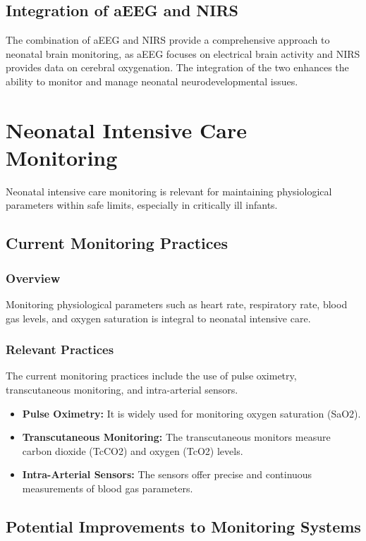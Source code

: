 \documentclass[12pt,journal,compsoc]{IEEEtran}
\begin{document}
\subsection{Integration of aEEG and NIRS}
The combination of aEEG and NIRS provide a comprehensive approach to neonatal brain monitoring, as aEEG focuses on electrical brain activity and NIRS provides data on cerebral oxygenation. The integration of the two enhances the ability to monitor and manage neonatal neurodevelopmental issues. 

\section{Neonatal Intensive Care Monitoring}
Neonatal intensive care monitoring is relevant for maintaining physiological parameters within safe limits, especially in critically ill infants.  

\subsection{Current Monitoring Practices}
\subsubsection{Overview}
Monitoring physiological parameters such as heart rate, respiratory rate, blood gas levels, and oxygen saturation is integral to neonatal intensive care. 

\subsubsection{Relevant Practices}
The current monitoring practices include the use of pulse oximetry, transcutaneous monitoring, and intra-arterial sensors. 

\begin{itemize}
    \item \textbf{Pulse Oximetry:} It is widely used for monitoring oxygen saturation (SaO2). 
    \item \textbf{Transcutaneous Monitoring:} The transcutaneous monitors measure carbon dioxide (TcCO2) and oxygen (TcO2) levels.  
    \item \textbf{Intra-Arterial Sensors:} The sensors offer precise and continuous measurements of blood gas parameters. 
\end{itemize}

\subsection{Potential Improvements to Monitoring Systems}
\end{document}

